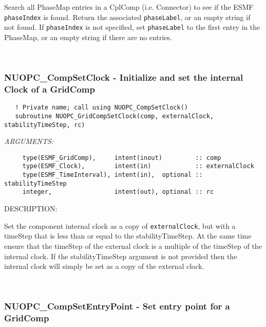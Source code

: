    Search all PhaseMap entries in a CplComp (i.e. Connector)
   to see if the ESMF {\tt phaseIndex} is found. Return the associated
   {\tt phaseLabel}, or an empty string if not found. If {\tt phaseIndex} is not
   specified, set {\tt phaseLabel} to the first entry in the PhaseMap, or 
   an empty string if there are no entries. 
 
\mbox{}\hrulefill\ 
 
\subsubsection [NUOPC\_CompSetClock] {NUOPC\_CompSetClock - Initialize and set the internal Clock of a GridComp}


\begin{verbatim}   ! Private name; call using NUOPC_CompSetClock()
   subroutine NUOPC_GridCompSetClock(comp, externalClock, stabilityTimeStep, rc)\end{verbatim}{\em ARGUMENTS:}
\begin{verbatim}     type(ESMF_GridComp),     intent(inout)         :: comp
     type(ESMF_Clock),        intent(in)            :: externalClock
     type(ESMF_TimeInterval), intent(in),  optional :: stabilityTimeStep
     integer,                 intent(out), optional :: rc\end{verbatim}
{\sf DESCRIPTION:\\ }


     \label{NUOPC_GridCompSetClock}
  
     Set the component internal clock as a copy of {\tt externalClock}, but
     with a timeStep that is less than or equal to the stabilityTimeStep.
     At the same time ensure that the timeStep of the external clock is
     a multiple of the timeStep of the internal clock. If the stabilityTimeStep
     argument is not provided then the internal clock will simply be set
     as a copy of the external clock. 
 
\mbox{}\hrulefill\ 
 
\subsubsection [NUOPC\_CompSetEntryPoint] {NUOPC\_CompSetEntryPoint - Set entry point for a GridComp}


